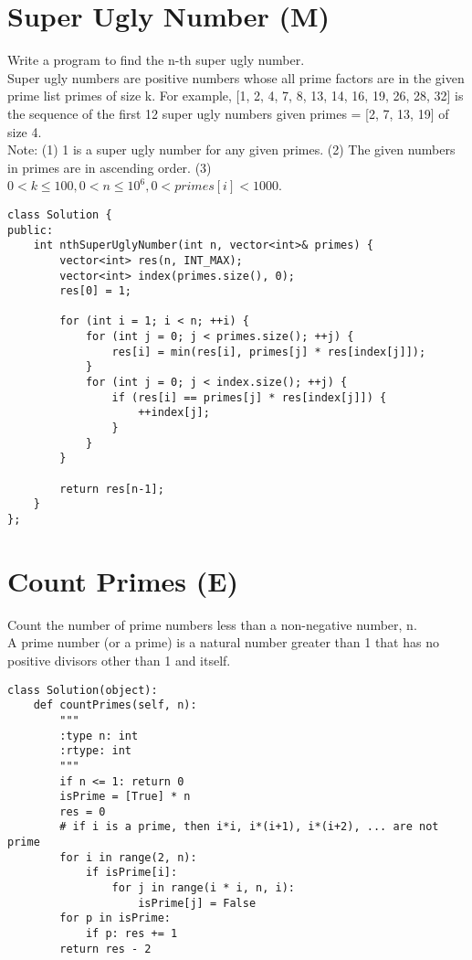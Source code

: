 \section{Super Ugly Number (M)}
Write a program to find the n-th super ugly number.\\

Super ugly numbers are positive numbers whose all prime factors are in the given prime list primes of size k. For example, [1, 2, 4, 7, 8, 13, 14, 16, 19, 26, 28, 32] is the sequence of the first 12 super ugly numbers given primes = [2, 7, 13, 19] of size 4.\\

Note:
(1) 1 is a super ugly number for any given primes.
(2) The given numbers in primes are in ascending order.
(3) $0 < k \leq 100, 0 < n \leq 10^6, 0 < primes[i] < 1000$. \\

\begin{lstlisting}
class Solution {
public:
    int nthSuperUglyNumber(int n, vector<int>& primes) {
        vector<int> res(n, INT_MAX);
        vector<int> index(primes.size(), 0);
        res[0] = 1;
        
        for (int i = 1; i < n; ++i) {
            for (int j = 0; j < primes.size(); ++j) {
                res[i] = min(res[i], primes[j] * res[index[j]]);
            }
            for (int j = 0; j < index.size(); ++j) {
                if (res[i] == primes[j] * res[index[j]]) {
                    ++index[j];
                }
            }
        }
        
        return res[n-1];
    }
};
\end{lstlisting}


\section{Count Primes (E)}
Count the number of prime numbers less than a non-negative number, n. \\
A prime number (or a prime) is a natural number greater than 1 that has no positive divisors other than 1 and itself. \\

\begin{lstlisting}
class Solution(object):
    def countPrimes(self, n):
        """
        :type n: int
        :rtype: int
        """
        if n <= 1: return 0
        isPrime = [True] * n
        res = 0
        # if i is a prime, then i*i, i*(i+1), i*(i+2), ... are not prime
        for i in range(2, n):
            if isPrime[i]:
                for j in range(i * i, n, i):
                    isPrime[j] = False
        for p in isPrime:
            if p: res += 1
        return res - 2
\end{lstlisting}
        


